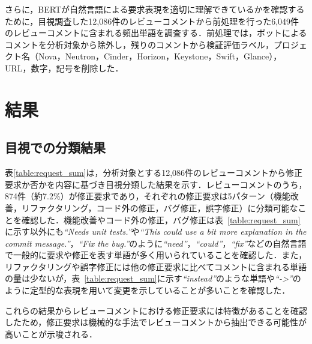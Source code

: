 \documentclass[11pt]{jreport}
\begin{document}
さらに，BERTが自然言語による要求表現を適切に理解できているかを確認するために，目視調査した12,086件のレビューコメントから前処理を行った6,049件のレビューコメントに含まれる頻出単語を調査する．前処理では，ボットによるコメントを分析対象から除外し，残りのコメントから検証評価ラベル，プロジェクト名（Nova，Neutron，Cinder，Horizon，Keystone，Swift，Glance），URL，数字，記号を削除した．

\section{結果}
\subsection{目視での分類結果}\label{subsec:request_manual_result}
表\ref{table:request_sum}は，分析対象とする12,086件のレビューコメントから修正要求か否かを内容に基づき目視分類した結果を示す．レビューコメントのうち，874件（約7.2\%）が修正要求であり，それぞれの修正要求は5パターン（機能改善，リファクタリング，コード外の修正，バグ修正，誤字修正）に分類可能なことを確認した．機能改善やコード外の修正，バグ修正は表~\ref{table:request_sum}に示す以外にも\textit{``Needs unit tests.''}や\textit{``This could use a bit more explanation in the commit message.''}，\textit{``Fix the bug.''}のように\textit{``need''}，\textit{``could''}，\textit{``fix''}などの自然言語で一般的に要求や修正を表す単語が多く用いられていることを確認した．また，リファクタリングや誤字修正には他の修正要求に比べてコメントに含まれる単語の量は少ないが，表~\ref{table:request_sum}に示す\textit{``instead''}のような単語や\textit{``-\textgreater''}のように定型的な表現を用いて変更を示していることが多いことを確認した．

これらの結果からレビューコメントにおける修正要求には特徴があることを確認したため，修正要求は機械的な手法でレビューコメントから抽出できる可能性が高いことが示唆される．

\begin{table}[t]
\centering
  \caption{修正要求に含まれていた内容}
  \label{table:request_sum}
\end{table}
\end{document}
